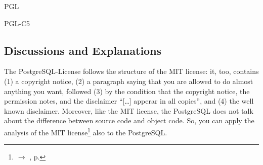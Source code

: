 \begin{license}{PGL}
\begin{lsuc}{PGL-C5}

  \begin{lsucrequires}
    \lsucmandatory{\giveLicense}
    \lsucoptional{\markModifications}
    \lsucoptional{\addToCopyrightDialog} 
    \lsucoptional{\linkToHomepage}
    \lsucoptional{\separateComponents}
  \end{lsucrequires}

  \lsucprohibitsnothing
\end{lsuc}


\subsection{Discussions and Explanations}
\label{PGLDiscussion}

The PostgreSQL-License follows the structure of the MIT license: it, too, contains 
(1) a copyright notice, 
(2) a paragraph saying that you are allowed to do almost anything you want,
    followed 
(3) by the condition that the copyright notice, the permission notes, and the
    disclaimer \enquote{[\ldots] apperar in all copies}, and 
(4) the well known disclaimer.\citePGL{}
Moreover, like the MIT license, the PostgreSQL does not talk about the
difference between source code and object code. So, you can apply the analysis
of the MIT license\footnote{$\rightarrow$ \oslic, p. \pageref{MITDiscussion}} 
also to the PostgreSQL.

\end{license}
%

